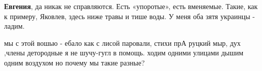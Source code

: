 \begin{itemize}
\begin{itemize}
\textbf{Евгения}, да никак не справляются. Есть «упоротые», есть вменяемые.
Такие, как к примеру, Яковлев, здесь ниже травы и тише воды. У меня оба зятя
украинцы - ладим.

\end{itemize}

 

мы с этой вошью - ебало как с лисой паровали, стихи прА руцкий мыр, дух ,члены
детородные я не шучу-гугл в помощь. ходим одними улицами дышим одним воздухом
но почему мы такие разные?

\end{itemize}

